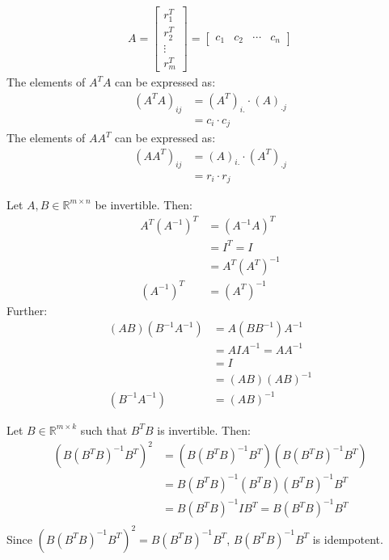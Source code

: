 \documentclass{article}
\begin{document}
\problem{}
\begin{align*}
    A = \begin{bmatrix}
        r_1^T \\
        r_2^T \\
        \vdots \\
        r_m^T 
    \end{bmatrix} = \begin{bmatrix}
        c_1 & c_2 & \cdots & c_n 
    \end{bmatrix}
\end{align*}
The elements of $A^TA$ can be expressed as:
\begin{align*}
    (A^TA)_{ij} & = (A^T)_{i.} \cdot (A)_{.j} \\
    & = c_i \cdot c_j
\end{align*}
The elements of $AA^T$ can be expressed as:
\begin{align*}
    (AA^T)_{ij} & = (A)_{i.} \cdot (A^T)_{.j} \\
    & = r_i \cdot r_j
\end{align*}
\clearpage

\problem{}
Let $A, B \in \mathbb{R}^{m\times n}$ be invertible. Then:
\begin{align*}
    A^T(A^{-1})^T & = (A^{-1}A)^T \\
    & = I^T = I \\
    & = A^T(A^T)^{-1} \\
    (A^{-1})^T & = (A^T)^{-1}
\end{align*}
Further:
\begin{align*}
    (AB)(B^{-1}A^{-1}) & = A(BB^{-1})A^{-1} \\
    & = AIA^{-1} = AA^{-1} \\
    & = I \\
    & = (AB)(AB)^{-1} \\
    (B^{-1}A^{-1}) & = (AB)^{-1}
\end{align*}
\clearpage

\problem{}
Let $B \in \mathbb{R}^{m\times k}$ such that $B^TB$ is invertible. Then:
\begin{align*}
    (B(B^TB)^{-1}B^T)^2 & = (B(B^TB)^{-1}B^T)(B(B^TB)^{-1}B^T) \\
    & = B(B^TB)^{-1}(B^TB)(B^TB)^{-1}B^T \\
    & = B(B^TB)^{-1}IB^T = B(B^TB)^{-1}B^T \\
\end{align*}
Since $(B(B^TB)^{-1}B^T)^2 = B(B^TB)^{-1}B^T$, $B(B^TB)^{-1}B^T$ is idempotent.
\end{document}
